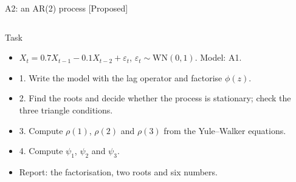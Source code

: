 \begin{frame}{A2: an AR(2) process [Proposed]}
\propsub
\itemsize{\scriptsize}
\begin{columns}[T]
\begin{column}{\taskw}
\begin{block}{Task}
\begin{itemize}
    \item $X_t = 0.7X_{t-1} - 0.1X_{t-2} + \varepsilon_t$, $\varepsilon_t \sim \mathrm{WN}(0, 1)$. Model: A1.
    \item 1. Write the model with the lag operator and factorise $\phi(z)$.
    \item 2. Find the roots and decide whether the process is stationary; check the three triangle conditions.
    \item 3. Compute $\rho(1)$, $\rho(2)$ and $\rho(3)$ from the Yule--Walker equations.
    \item 4. Compute $\psi_1$, $\psi_2$ and $\psi_3$.
    \item Report: the factorisation, two roots and six numbers.
\end{itemize}
\end{block}
\end{column}
\begin{column}{\solw}
\end{column}
\end{columns}
\end{frame}

